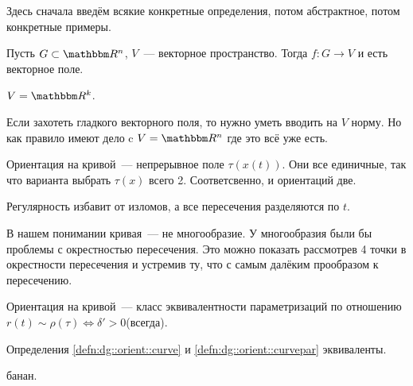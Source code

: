\documentclass[12pt,draft,timbord]{longnotes}
\begin{document}
Здесь сначала введём всякие конкретные определения, потом абстрактное, потом конкретные примеры.

\begin{defn}\label{defn:dg::orient::vecf}
  Пусть $G \subset \R^n$, $V$~--- векторное пространство. Тогда $f \colon G \to V$ и есть векторное 
  поле.
\end{defn}
\begin{exmp}\label{exmp:dg::orient::vecf}
  $V = \R^k$.
\end{exmp}

\begin{rem}\label{rem:dg::orient::vecf} 
  Если захотеть гладкого векторного поля,
  то нужно уметь вводить на $V$ норму.  Но как правило имеют
  дело c $V = \R^n$ где это всё уже есть.
\end{rem}

\begin{defn}\label{defn:dg::orient::curve}
  Ориентация на кривой~--- непрерывное поле $\tau(x(t))$. Они все единичные, так что варианта
  выбрать $\tau(x)$ всего 2. Соответсвенно, и ориентаций две.
\end{defn}
\begin{rem}\label{rem:dg::orient::curvecor}
  Регулярность избавит от изломов, а все пересечения разделяются по $t$.
\end{rem}

\begin{rem}[\flame]\label{rem:dg::orient::curverman}
  В нашем понимании кривая~--- не многообразие. У многообразия были бы проблемы с окрестностью
  пересечения. Это можно показать рассмотрев 4 точки в окрестности пересечения и устремив ту, что
  с самым далёким прообразом к пересечению.
\end{rem}

\begin{defn}\label{defn:dg::orient::curvepar}
  Ориентация на кривой~--- класс эквивалентности параметризаций по отношению
  $r(t) \sim \rho(\tau )  \Leftrightarrow  \delta' > 0$(всегда). 
\end{defn}

\begin{prop}\label{prop:dg::orient::eqcurve}
  Определения \ref{defn:dg::orient::curve} и \ref{defn:dg::orient::curvepar} эквиваленты.
\end{prop}
\begin{lproof}
  банан.
\end{lproof}
\end{document}
